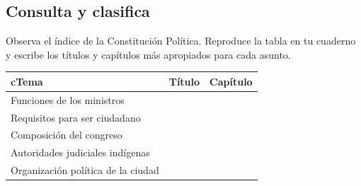 \documentclass[10pt,twoside]{article}
\begin{document}
\subsection*{Consulta y clasifica}
Observa el índice de la Constitución Política. Reproduce la tabla en tu cuaderno y escribe los títulos y capítulos  más apropiados para cada asunto.
\begin{center}
\begin{tabular}{|l|l|l|}
\hline 
{c}Tema & Título & Capítulo \\ 
\hline 
Funciones de los ministros &  &  \\ 
\hline 
Requisitos para ser ciudadano &  &  \\ 
\hline 
Composición del congreso &  &  \\ 
\hline 
Autoridades judiciales indígenas &  &  \\ 
\hline 
Organización política de la ciudad &  &  \\ 
\hline 
\end{tabular} 
\end{center}
\end{document}
